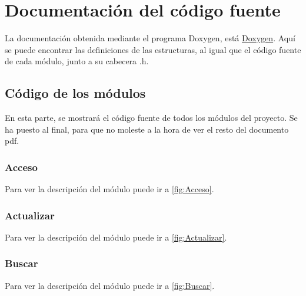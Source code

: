 

\section{Documentación del código fuente}

La documentación obtenida mediante el programa Doxygen, está \href{DOC_DOXYGEN/index.html}{Doxygen}.
Aquí se puede encontrar las definiciones de las estructuras, al igual que el código fuente de cada módulo, junto a su cabecera .h.

%

\subsection{Código de los módulos}

En esta parte, se mostrará el código fuente de todos los módulos del proyecto. Se ha puesto al final, para que no moleste a la hora de ver el resto del documento pdf.
\label{fig:CodigoModulos}

\subsubsection{Acceso}

Para ver la descripción del módulo puede ir a \ref{fig:Acceso}.

\label{fig:AccesoCod}


\subsubsection{Actualizar}

Para ver la descripción del módulo puede ir a \ref{fig:Actualizar}.

\label{fig:ActualizarCod}


\subsubsection{Buscar}

Para ver la descripción del módulo puede ir a \ref{fig:Buscar}.

\label{fig:BuscarCod}



